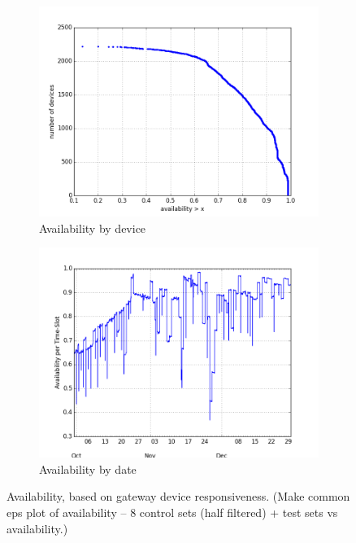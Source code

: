 \begin{figure}[t!]
\begin{minipage}{1\linewidth}
\centering
%
\begin{subfigure}[b]{0.5\linewidth}
\includegraphics[width=\linewidth]{figures/250-test_dw-availability-CDF.png}
  \caption{Availability by device}
  \label{fig:availability-device}
\end{subfigure}
%
\hspace{-1em}
%
\begin{subfigure}[b]{0.5\linewidth}
\includegraphics[width=\linewidth]{figures/250-test_dw-availability-by-date.png}
  \caption{Availability by date}
  \label{fig:availability-date}
\end{subfigure}
%
\end{minipage}
\caption{Availability, based on gateway device responsiveness. (Make common eps plot of availability -- 8 control sets (half filtered) + test sets vs availability.) }
\label{fig:availability}
\end{figure}



